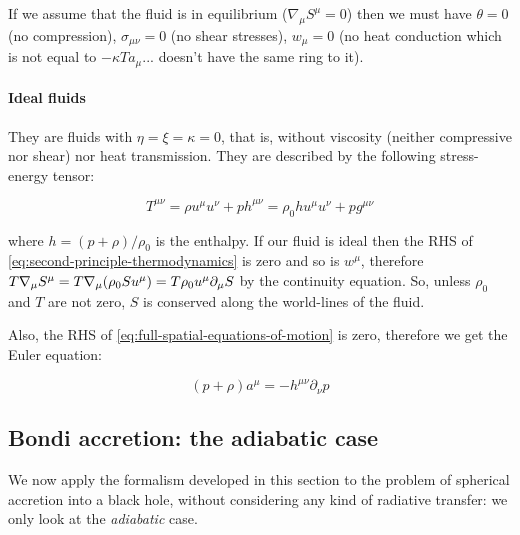 \documentclass[main.tex]{subfiles}
\begin{document}
If we assume that the fluid is in equilibrium (\(\nabla_\mu S^\mu = 0\)) then we must have \(\theta = 0\) (no compression), \(\sigma_{\mu\nu} = 0 \) (no shear stresses), \(w_\mu=0\) (no heat conduction which is not equal to \(-\kappa T a_\mu\)... doesn't have the same ring to it).

%


\paragraph{Ideal fluids}

They are fluids with \(\eta=\xi=\kappa=0\), that is, without viscosity (neither compressive nor shear) nor heat transmission.
They are described by the following stress-energy tensor:

\begin{equation}
    T^{\mu\nu} = \rho u^\mu u^\nu + p h^{\mu\nu} = \rho_0 h u^{\mu} u^\nu + p g^{\mu\nu}
\end{equation}

where \(h = (p + \rho) / \rho_0\) is the enthalpy. If our fluid is ideal then the RHS of \eqref{eq:second-principle-thermodynamics} is zero and so is \(w^\mu\),
therefore \(T \nabla_\mu S^\mu = T \nabla_\mu \qty(\rho_0 S u^\mu) = T \rho_0 u^\mu \partial_\mu S\) by the continuity equation. So, unless \(\rho_0\) and \(T\) are not zero, \(S\) is conserved along the world-lines of the fluid.

Also, the RHS of \eqref{eq:full-spatial-equations-of-motion} is zero, therefore we get the Euler equation:

\begin{equation} \label{eq:relativistic-euler}
    (p+\rho) a^\mu = - h^{\mu \nu} \partial_\nu p
\end{equation}

\subsection{Bondi accretion: the adiabatic case}

We now apply the formalism developed in this section to the problem of spherical accretion into a black hole, without considering any kind of radiative transfer: we only look at the \emph{adiabatic} case.
\end{document}
